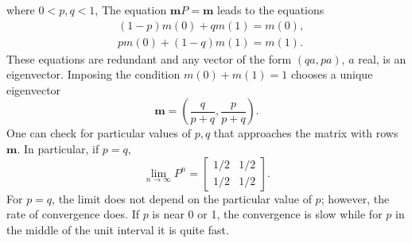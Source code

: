 \documentclass{stml-l}
\theoremstyle{definition}
\numberwithin{equation}{chapter}
\numberwithin{figure}{chapter}
\numberwithin{figure}{section}
\begin{document}
where $0<p,q<1$, The equation $\mathbf{m}P=\mathbf{m}$ leads to the
equations
\begin{align*}
&(1-p)m(0)+qm(1)=m(0),\\
& pm(0)+(1-q)m(1)=m(1).
\end{align*}
These equations are redundant and any vector of the form $(qa,pa)$,
$a$ real, is an eigenvector. Imposing the condition $m(0)+m(1)=1$
chooses a unique eigenvector
\begin{equation*}
\mathbf{m}=\left(\frac{q}{p+q},\frac{p}{p+q}\right).
\end{equation*}
One can check for particular values of $p,q$ that approaches the
matrix with rows $\mathbf{m}$. In particular, if $p=q$,
\begin{equation*}
\lim\limits_{n\rightarrow\infty}P^{n}=\left[\begin{array}{cc}
1/2 & 1/2\\
1/2 & 1/2
\end{array}\right].
\end{equation*}
For $p=q$, the limit does not depend on the particular value of $p$;
however, the rate of convergence does. If $p$ is near $0$ or 1, the
convergence is slow while for $p$ in the middle of the unit
interval it is quite fast.
\end{document}
